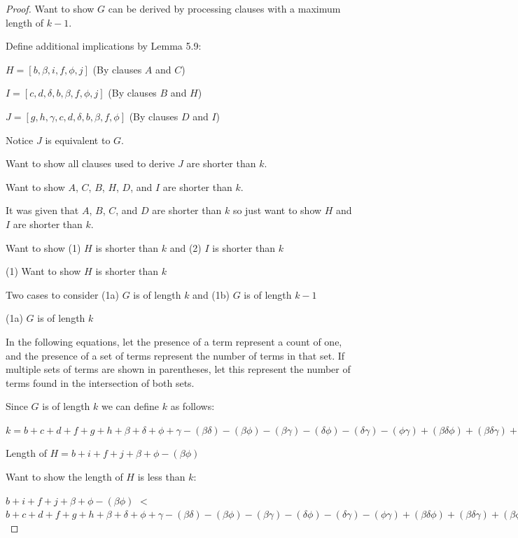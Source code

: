 \documentclass[manuscript]{acmart}
\begin{document}
\begin{proof}
        Want to show $G$ can be derived by processing clauses with a maximum length of $k - 1$.

        Define additional implications by Lemma 5.9:

        $H = [b, \beta, i, f, \phi, j]$ (By clauses $A$ and $C$)

        $I = [c, d, \delta, b, \beta, f, \phi, j]$ (By clauses $B$ and $H$)

        $J = [g, h, \gamma, c, d, \delta, b, \beta, f, \phi]$ (By clauses $D$ and $I$)

        Notice $J$ is equivalent to $G$.

        Want to show all clauses used to derive $J$ are shorter than $k$.

        Want to show $A$, $C$, $B$, $H$, $D$, and $I$ are shorter than $k$.

        It was given that $A$, $B$, $C$, and $D$ are shorter than $k$ so just want to show $H$ and $I$ are shorter than $k$.

        Want to show (1) $H$ is shorter than $k$ and (2) $I$ is shorter than $k$

        (1) Want to show $H$ is shorter than $k$

        Two cases to consider (1a) $G$ is of length $k$ and (1b) $G$ is of length $k - 1$

        (1a) $G$ is of length $k$

        In the following equations, let the presence of a term represent a count of one, and the presence of a set of terms represent the number of terms in that set. If multiple sets of terms are shown in parentheses, let this represent the number of terms found in the intersection of both sets.

        Since $G$ is of length $k$ we can define $k$ as follows:

        $k = b + c + d + f + g + h
            + \beta + \delta + \phi + \gamma
            - (\beta \delta) - (\beta \phi) - (\beta \gamma) - (\delta \phi) - (\delta \gamma) -(\phi \gamma)
            + (\beta \delta \phi) + (\beta \delta \gamma) + (\beta \phi \gamma) + (\delta \phi \gamma)
            - (\beta \delta \phi \gamma)
        $

        Length of $H = b + i + f + j + \beta + \phi - (\beta \phi)$
        
        Want to show the length of $H$ is less than $k$:

        $b + i + f + j + \beta + \phi - (\beta \phi)$
        $<$
        $b + c + d + f + g + h
            + \beta + \delta + \phi + \gamma
            - (\beta \delta) - (\beta \phi) - (\beta \gamma) - (\delta \phi) - (\delta \gamma) -(\phi \gamma)
            + (\beta \delta \phi) + (\beta \delta \gamma) + (\beta \phi \gamma) + (\delta \phi \gamma)
            - (\beta \delta \phi \gamma)
        $


\end{proof}
\end{document}
